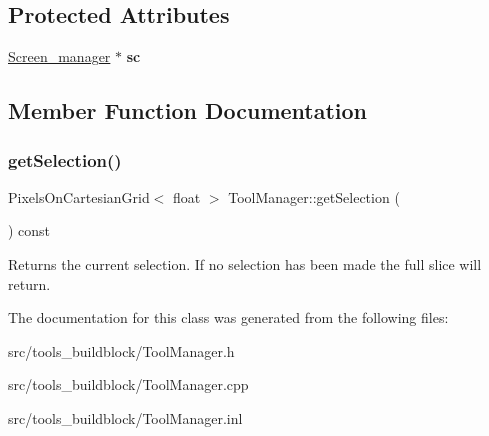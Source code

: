 \subsection*{Protected Attributes}
\begin{DoxyCompactItemize}
\item 
\mbox{\label{classToolManager_a04210d43878f8b154b927b3d88e4415c}} 
\mbox{\hyperlink{classScreen__manager}{Screen\+\_\+manager}} $\ast$ {\bfseries sc}
\end{DoxyCompactItemize}


\subsection{Member Function Documentation}
\mbox{\label{classToolManager_a2b92398db6ca45c14b28bc54fbe4d64a}} 
\subsubsection{\texorpdfstring{get\+Selection()}{getSelection()}}
{\footnotesize\ttfamily Pixels\+On\+Cartesian\+Grid$<$ float $>$ Tool\+Manager\+::get\+Selection (\begin{DoxyParamCaption}{ }\end{DoxyParamCaption}) const}

Returns the current selection. If no selection has been made the full slice will return. 

The documentation for this class was generated from the following files\+:\begin{DoxyCompactItemize}
\item 
src/tools\+\_\+buildblock/Tool\+Manager.\+h\item 
src/tools\+\_\+buildblock/Tool\+Manager.\+cpp\item 
src/tools\+\_\+buildblock/Tool\+Manager.\+inl\end{DoxyCompactItemize}
